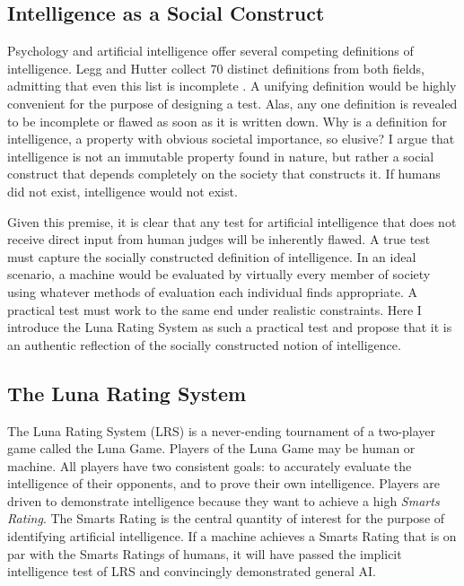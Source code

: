 \subsection{Intelligence as a Social Construct}

Psychology and artificial intelligence offer several competing definitions of intelligence. Legg and Hutter collect 70 distinct definitions from both fields, admitting that even this list is incomplete \cite{legg07}. A unifying definition would be highly convenient for the purpose of designing a test. Alas, any one definition is revealed to be incomplete or flawed as soon as it is written down. Why is a definition for intelligence, a property with obvious societal importance, so elusive? I argue that intelligence is not an immutable property found in nature, but rather a social construct that depends completely on the society that constructs it. If humans did not exist, intelligence would not exist. 

Given this premise, it is clear that any test for artificial intelligence that does not receive direct input from human judges will be inherently flawed. A true test must capture the socially constructed definition of intelligence. In an ideal scenario, a machine would be evaluated by virtually every member of society using whatever methods of evaluation  each individual finds appropriate. A practical test must work to the same end under realistic constraints. Here I introduce the Luna Rating System as such a practical test and propose that it is an authentic reflection of the socially constructed notion of intelligence.

\subsection{The Luna Rating System}

The Luna Rating System (LRS) is a never-ending tournament of a two-player game called the Luna Game. Players of the Luna Game may be human or machine. All players have two consistent goals: to accurately evaluate the intelligence of their opponents, and to prove their own intelligence. Players are driven to demonstrate intelligence because they want to achieve a high \textit{Smarts Rating}. The Smarts Rating is the central quantity of interest for the purpose of identifying artificial intelligence. If a machine achieves a Smarts Rating that is on par with the Smarts Ratings of humans, it will have passed the implicit intelligence test of LRS and convincingly demonstrated general AI.

